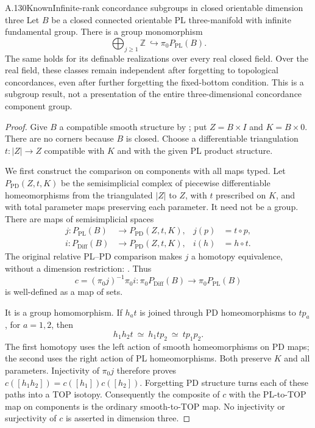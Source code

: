 \begin{saresult}{A.130}{Known}{Infinite-rank concordance subgroups in closed orientable dimension three}
Let $B$ be a closed connected orientable PL three-manifold with
infinite fundamental group. There is a group monomorphism
\[
 \bigoplus_{j\ge1}\mathbb Z\ \hookrightarrow
 \pi_0P_{\mathrm{PL}}(B).
                                                        \tag{A.130.1}
\]
The same holds for its definable realizations over every real
closed field. Over the real field, these classes remain independent
after forgetting to topological concordances, even after further
forgetting the fixed-bottom condition.
This is a subgroup result, not a presentation of the entire
three-dimensional concordance component group.
\end{saresult}
\begin{proof}
Give $B$ a compatible smooth structure by
\cite[Essay~I, p.~39]{KirbySiebenmann1977}; put $Z=B\times I$ and
$K=B\times0$. There are no corners because $B$ is closed.
Choose a differentiable triangulation
$t:|Z|\longrightarrow Z$ compatible with $K$ and with the given
PL product structure.

We first construct the comparison on components with all maps typed.
Let $P_{\mathrm{PD}}(Z,t,K)$ be the semisimplicial complex of
piecewise differentiable homeomorphisms from the triangulated
$|Z|$ to $Z$, with $t$ prescribed on $K$, and with total parameter
maps preserving each parameter. It need not be a group.
There are maps of semisimplicial spaces
\[
 \begin{aligned}
 j:P_{\mathrm{PL}}(B)&\longrightarrow P_{\mathrm{PD}}(Z,t,K),
       &j(p)&=t\circ p,\\
 i:P_{\mathrm{Diff}}(B)&\longrightarrow P_{\mathrm{PD}}(Z,t,K),
       &i(h)&=h\circ t.
 \end{aligned}
                                                        \tag{A.130.2}
\]
The original relative PL--PD comparison makes $j$ a homotopy
equivalence, without a dimension restriction:
\cite[definitions and comparison, pp.~1--2; Theorem~1.1(c), p.~8]{BurgheleaLashof1974I}.
Thus
\[
 c=(\pi_0j)^{-1}\pi_0i:
 \pi_0P_{\mathrm{Diff}}(B)\longrightarrow
 \pi_0P_{\mathrm{PL}}(B)
                                                        \tag{A.130.3}
\]
is well-defined as a map of sets.

It is a group homomorphism. If $h_at$ is joined through PD
homeomorphisms to $tp_a$, for $a=1,2$, then
\[
 h_1h_2t\ \simeq\ h_1tp_2\ \simeq\ tp_1p_2.
\]
The first homotopy uses the left action of smooth homeomorphisms
on PD maps; the second uses the right action of PL homeomorphisms.
Both preserve $K$ and all parameters. Injectivity of $\pi_0j$
therefore proves $c([h_1h_2])=c([h_1])c([h_2])$.
Forgetting PD structure turns each of these paths into a TOP
isotopy. Consequently the composite of $c$ with the PL-to-TOP
map on components is the ordinary smooth-to-TOP map.
No injectivity or surjectivity of $c$ is asserted in dimension three.


\end{proof}
